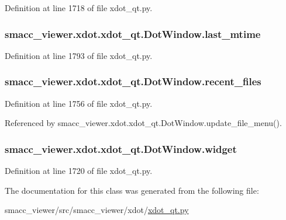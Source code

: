 Definition at line 1718 of file xdot\+\_\+qt.\+py.

\subsubsection[{\texorpdfstring{last\+\_\+mtime}{last_mtime}}]{\setlength{\rightskip}{0pt plus 5cm}smacc\+\_\+viewer.\+xdot.\+xdot\+\_\+qt.\+Dot\+Window.\+last\+\_\+mtime}\hypertarget{classsmacc__viewer_1_1xdot_1_1xdot__qt_1_1DotWindow_ad89b946c94e2cf6bd4d9b7caa01eeb80}{}\label{classsmacc__viewer_1_1xdot_1_1xdot__qt_1_1DotWindow_ad89b946c94e2cf6bd4d9b7caa01eeb80}


Definition at line 1793 of file xdot\+\_\+qt.\+py.

\subsubsection[{\texorpdfstring{recent\+\_\+files}{recent_files}}]{\setlength{\rightskip}{0pt plus 5cm}smacc\+\_\+viewer.\+xdot.\+xdot\+\_\+qt.\+Dot\+Window.\+recent\+\_\+files}\hypertarget{classsmacc__viewer_1_1xdot_1_1xdot__qt_1_1DotWindow_a6eabf9d0596a910be7ecb943d65e7494}{}\label{classsmacc__viewer_1_1xdot_1_1xdot__qt_1_1DotWindow_a6eabf9d0596a910be7ecb943d65e7494}


Definition at line 1756 of file xdot\+\_\+qt.\+py.



Referenced by smacc\+\_\+viewer.\+xdot.\+xdot\+\_\+qt.\+Dot\+Window.\+update\+\_\+file\+\_\+menu().

\subsubsection[{\texorpdfstring{widget}{widget}}]{\setlength{\rightskip}{0pt plus 5cm}smacc\+\_\+viewer.\+xdot.\+xdot\+\_\+qt.\+Dot\+Window.\+widget}\hypertarget{classsmacc__viewer_1_1xdot_1_1xdot__qt_1_1DotWindow_a3a941e7b121c8ce6478a4591e0f9f263}{}\label{classsmacc__viewer_1_1xdot_1_1xdot__qt_1_1DotWindow_a3a941e7b121c8ce6478a4591e0f9f263}


Definition at line 1720 of file xdot\+\_\+qt.\+py.



The documentation for this class was generated from the following file\+:\begin{DoxyCompactItemize}
\item 
smacc\+\_\+viewer/src/smacc\+\_\+viewer/xdot/\hyperlink{xdot__qt_8py}{xdot\+\_\+qt.\+py}\end{DoxyCompactItemize}
